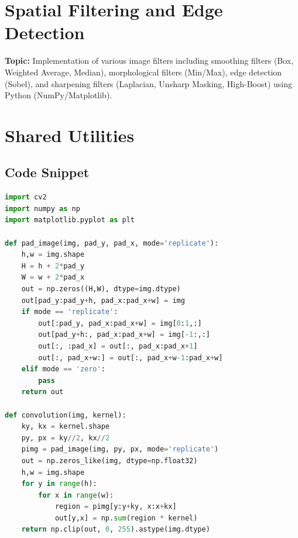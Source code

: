 \documentclass[12pt,a4paper]{report}
\begin{document}
\pagestyle{fancy}
\tableofcontents
\newpage

\section*{\LARGE Spatial Filtering and Edge Detection}
\textbf{Topic:} Implementation of various image filters including smoothing filters (Box, Weighted Average, Median), morphological filters (Min/Max), edge detection (Sobel), and sharpening filters (Laplacian, Unsharp Masking, High-Boost) using Python (NumPy/Matplotlib).


\section*{Shared Utilities}

\setcounter{section}{0}

\subsection*{Code Snippet}
\begin{lstlisting}[language=Python, caption={Padding and Convolution Utilities}]
import cv2
import numpy as np
import matplotlib.pyplot as plt

def pad_image(img, pad_y, pad_x, mode='replicate'):
    h,w = img.shape
    H = h + 2*pad_y
    W = w + 2*pad_x
    out = np.zeros((H,W), dtype=img.dtype)
    out[pad_y:pad_y+h, pad_x:pad_x+w] = img
    if mode == 'replicate':
        out[:pad_y, pad_x:pad_x+w] = img[0:1,:]
        out[pad_y+h:, pad_x:pad_x+w] = img[-1:,:]
        out[:, :pad_x] = out[:, pad_x:pad_x+1]
        out[:, pad_x+w:] = out[:, pad_x+w-1:pad_x+w]
    elif mode == 'zero':
        pass
    return out

def convolution(img, kernel):
    ky, kx = kernel.shape
    py, px = ky//2, kx//2
    pimg = pad_image(img, py, px, mode='replicate')
    out = np.zeros_like(img, dtype=np.float32)
    h,w = img.shape
    for y in range(h):
        for x in range(w):
            region = pimg[y:y+ky, x:x+kx]
            out[y,x] = np.sum(region * kernel)
    return np.clip(out, 0, 255).astype(img.dtype)
\end{lstlisting}
\end{document}
